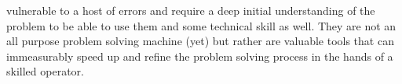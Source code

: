 \documentclass[10pt]{report}
\begin{document}
vulnerable to a host of errors and require a deep initial understanding of the problem to be able to use them and some technical skill as well. They are not an all purpose problem solving machine (yet) but rather are valuable tools that can immeasurably speed up and refine the problem solving process in the hands of a skilled operator. 
\end{document}
